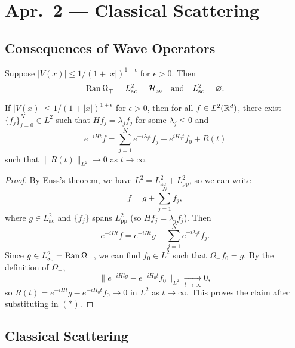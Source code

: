 \chapter{Apr.~2 --- Classical Scattering}

\section{Consequences of Wave Operators}

\begin{theorem}[Enss]
  Suppose $|V(x)| \le 1 / (1 + |x|)^{1 + \epsilon}$
  for $\epsilon > 0$. Then
  \[
    \operatorname{Ran} \Omega_{\mp} = L^2_{\mathrm{ac}} = \mathcal{H}_{\mathrm{ac}}
    \quad \text{and} \quad
    L^2_{\mathrm{sc}} = \varnothing.
  \]
\end{theorem}

\begin{corollary}
  If $|V(x)| \le 1 / (1 + |x|)^{1 + \epsilon}$ for
  $\epsilon > 0$, then for all $f \in L^2(\mathbb{R}^d)$,
  there exist $\{f_j\}_{j = 0}^N \in L^2$
  such that $Hf_j = \lambda_j f_j$ for some
  $\lambda_j \le 0$ and
  \[
    e^{-iHt} f
    = \sum_{j = 1}^N e^{-i \lambda_j t} f_j + e^{iH_0 t} f_0 + R(t)
  \]
  such that $\|R(t)\|_{L^2} \to 0$ as $t \to \infty$.
\end{corollary}

\begin{proof}
  By Enss's theorem, we have
  $L^2 = L^2_{\mathrm{ac}} + L^2_{\mathrm{pp}}$, so
  we can write
  \[
    f = g + \sum_{j = 1}^N f_j,
  \]
  where $g \in L^2_{\mathrm{ac}}$ and
  $\{f_j\}$ spans $L^2_{\mathrm{pp}}$ (so
  $Hf_j = \lambda_j f_j$). Then
  \[
    e^{-iHt} f = e^{-iHt} g + \sum_{j = 1}^N e^{-i \lambda_j t} f_j. \tag{$*$}
  \]
  Since $g \in L^2_{\mathrm{ac}} = \operatorname{Ran} \Omega_-$,
  we can find $f_0 \in L^2$ such that
  $\Omega_- f_0 = g$. By the definition of
  $\Omega_-$,
  \[
    \| e^{-iHt g} - e^{-iH_0 t} f_0 \|_{L^2} \xrightarrow[t \to \infty]{} 0,
  \]
  so $R(t) = e^{-iHt} g - e^{-iH_0 t} f_0 \to 0$
  in $L^2$ as $t \to \infty$. This proves the
  claim after substituting in $(*)$.
\end{proof}

\section{Classical Scattering}

